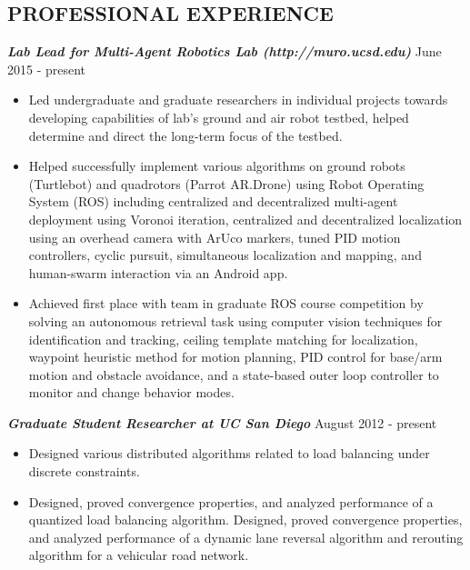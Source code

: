 \documentclass{res}
\begin{document}
\begin{resume}
\section{PROFESSIONAL EXPERIENCE}
\vspace{1ex}
{\sl \bf Lab Lead for Multi-Agent Robotics Lab (http://muro.ucsd.edu)} \hfill June 2015 - present 
\vspace*{.5ex}
\begin{itemize}
\item Led undergraduate and graduate researchers in individual projects towards developing capabilities of lab's ground and air robot testbed, helped determine and direct the long-term focus of the testbed. 
\vspace*{-.5ex}
\item Helped successfully implement various algorithms on ground robots (Turtlebot) and quadrotors (Parrot AR.Drone) using Robot Operating System (ROS) including centralized and decentralized multi-agent deployment using Voronoi iteration, centralized and decentralized localization using an overhead camera with ArUco markers, tuned PID motion controllers, cyclic pursuit, simultaneous localization and mapping, and human-swarm interaction via an Android app.
\vspace*{-.5ex}
\item Achieved first place with team in graduate ROS course competition by solving an autonomous retrieval task using computer vision techniques for identification and tracking, ceiling template matching for localization, waypoint heuristic method for motion planning, PID control for base/arm motion and obstacle avoidance, and a state-based outer loop controller to monitor and change behavior modes.
\end{itemize}
\vspace*{-1ex}
{\sl  \bf Graduate Student Researcher at UC San Diego} \hfill August 2012 - present
\vspace*{.5ex}
\begin{itemize}
\item Designed various distributed algorithms related to load balancing under discrete constraints.
\vspace*{-.5ex}
\item Designed, proved convergence properties, and analyzed performance of a quantized load balancing algorithm. Designed, proved convergence properties, and analyzed performance of a dynamic lane reversal algorithm and rerouting algorithm for a vehicular road network. 
\vspace*{-.5ex}

\end{itemize}
\end{resume}
\end{document}
